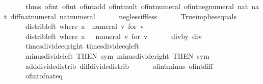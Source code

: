 \begin{isabellebody}
\ \ \ \ \ \ {\isacharat}{\kern0pt}{\isacharbraceleft}{\kern0pt}thms\ of{\isacharunderscore}{\kern0pt}int{\isacharunderscore}{\kern0pt}{}\ of{\isacharunderscore}{\kern0pt}int{\isacharunderscore}{\kern0pt}{}\ of{\isacharunderscore}{\kern0pt}int{\isacharunderscore}{\kern0pt}add\ of{\isacharunderscore}{\kern0pt}int{\isacharunderscore}{\kern0pt}mult\ of{\isacharunderscore}{\kern0pt}int{\isacharunderscore}{\kern0pt}numeral\ of{\isacharunderscore}{\kern0pt}int{\isacharunderscore}{\kern0pt}neg{\isacharunderscore}{\kern0pt}numeral\ nat{\isacharunderscore}{\kern0pt}{}\ nat{\isacharunderscore}{\kern0pt}{}\ diff{\isacharunderscore}{\kern0pt}nat{\isacharunderscore}{\kern0pt}numeral\ nat{\isacharunderscore}{\kern0pt}numeral\isanewline
\ \ \ \ \ \ neg{\isacharunderscore}{\kern0pt}less{\isacharunderscore}{\kern0pt}iff{\isacharunderscore}{\kern0pt}less\isanewline
\ \ \ \ \ \ True{\isacharunderscore}{\kern0pt}implies{\isacharunderscore}{\kern0pt}equals\isanewline
\ \ \ \ \ \ distrib{\isacharunderscore}{\kern0pt}left\ {\isacharbrackleft}{\kern0pt}where\ a\ {\isacharequal}{\kern0pt}\ {\isachardoublequote}{\kern0pt}numeral\ v{\isachardoublequote}{\kern0pt}\ for\ v{\isacharbrackright}{\kern0pt}\isanewline
\ \ \ \ \ \ distrib{\isacharunderscore}{\kern0pt}left\ {\isacharbrackleft}{\kern0pt}where\ a\ {\isacharequal}{\kern0pt}\ {\isachardoublequote}{\kern0pt}{\isacharminus}{\kern0pt}\ numeral\ v{\isachardoublequote}{\kern0pt}\ for\ v{\isacharbrackright}{\kern0pt}\isanewline
\ \ \ \ \ \ div{\isacharunderscore}{\kern0pt}by{\isacharunderscore}{\kern0pt}{}\ div{\isacharunderscore}{\kern0pt}{}\isanewline
\ \ \ \ \ \ times{\isacharunderscore}{\kern0pt}divide{\isacharunderscore}{\kern0pt}eq{\isacharunderscore}{\kern0pt}right\ times{\isacharunderscore}{\kern0pt}divide{\isacharunderscore}{\kern0pt}eq{\isacharunderscore}{\kern0pt}left\isanewline
\ \ \ \ \ \ minus{\isacharunderscore}{\kern0pt}divide{\isacharunderscore}{\kern0pt}left\ {\isacharbrackleft}{\kern0pt}THEN\ sym{\isacharbrackright}{\kern0pt}\ minus{\isacharunderscore}{\kern0pt}divide{\isacharunderscore}{\kern0pt}right\ {\isacharbrackleft}{\kern0pt}THEN\ sym{\isacharbrackright}{\kern0pt}\isanewline
\ \ \ \ \ \ add{\isacharunderscore}{\kern0pt}divide{\isacharunderscore}{\kern0pt}distrib\ diff{\isacharunderscore}{\kern0pt}divide{\isacharunderscore}{\kern0pt}distrib\isanewline
\ \ \ \ \ \ of{\isacharunderscore}{\kern0pt}int{\isacharunderscore}{\kern0pt}minus\ of{\isacharunderscore}{\kern0pt}int{\isacharunderscore}{\kern0pt}diff\isanewline
\ \ \ \ \ \ of{\isacharunderscore}{\kern0pt}int{\isacharunderscore}{\kern0pt}of{\isacharunderscore}{\kern0pt}nat{\isacharunderscore}{\kern0pt}eq{\isacharbraceright}{\kern0pt}\isanewline

\end{isabellebody}
